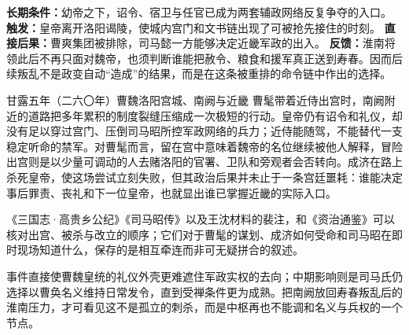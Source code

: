 \begin{causalchain}[高平陵不是一日“夺权”]
\textbf{长期条件：}幼帝之下，诏令、宿卫与任官已成为两套辅政网络反复争夺的入口。
\textbf{触发：}皇帝离开洛阳谒陵，使城内宫门和文书链出现了可被抢先接住的时刻。
\textbf{直接后果：}曹爽集团被排除，司马懿一方能够决定近畿军政的出入。
\textbf{反馈：}淮南将领此后不再只面对魏帝，也须判断谁能把赦令、粮食和援军真正送到寿春。因而后续叛乱不是政变自动“造成”的结果，而是在这条被重排的命令链中作出的选择。
\end{causalchain}

\begin{event}{}{甘露五年（二六〇年）}{曹魏}{洛阳宫城、南阙与近畿}
曹髦带着近侍出宫时，南阙附近的道路把多年累积的制度裂缝压缩成一次极短的行动。皇帝仍有诏令和礼仪，却没有足以穿过宫门、压倒司马昭所控军政网络的兵力；近侍能随驾，不能替代一支稳定听命的禁军。对曹髦而言，留在宫中意味着魏帝的名位继续被他人解释，冒险出宫则是以少量可调动的人去赌洛阳的官署、卫队和旁观者会否转向。成济在路上杀死皇帝，使这场尝试立刻失败，但其政治后果并未止于一条宫廷噩耗：谁能决定事后罪责、丧礼和下一位皇帝，也就显出谁已掌握近畿的实际入口。

\begin{debate}
《三国志·高贵乡公纪》《司马昭传》以及王沈材料的裴注，和《资治通鉴》可以核对出宫、被杀与改立的顺序；它们对于曹髦的谋划、成济如何受命和司马昭在即时现场知道什么，保存的是相互牵连而非可无疑拼合的叙述。
\end{debate}
事件直接使曹魏皇统的礼仪外壳更难遮住军政实权的去向；中期影响则是司马氏仍选择以曹奂名义维持日常发令，直到受禅条件更为成熟。把南阙放回寿春叛乱后的淮南压力，才可看见这不是孤立的刺杀，而是中枢再也不能调和名义与兵权的一个节点。
\end{event}

